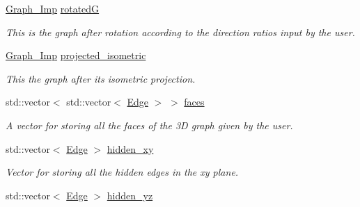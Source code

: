 \begin{DoxyCompactItemize}
\mbox{\label{class_three___d__to___two___d_a89fe876ef08c6dc1a5afd31f64306d8b}} 
\mbox{\hyperlink{class_graph___imp}{Graph\+\_\+\+Imp}} \mbox{\hyperlink{class_three___d__to___two___d_a89fe876ef08c6dc1a5afd31f64306d8b}{rotatedG}}
\begin{DoxyCompactList}\small\item\em This is the graph after rotation according to the direction ratios input by the user. \end{DoxyCompactList}\item 
\mbox{\label{class_three___d__to___two___d_a93664d1beddcbd0153401e363684f2ea}} 
\mbox{\hyperlink{class_graph___imp}{Graph\+\_\+\+Imp}} \mbox{\hyperlink{class_three___d__to___two___d_a93664d1beddcbd0153401e363684f2ea}{projected\+\_\+isometric}}
\begin{DoxyCompactList}\small\item\em This the graph after its isometric projection. \end{DoxyCompactList}\item 
\mbox{\label{class_three___d__to___two___d_a1cd5ced0bcecb01a9152a4c67ec0146a}} 
std\+::vector$<$ std\+::vector$<$ \mbox{\hyperlink{struct_edge}{Edge}} $>$ $>$ \mbox{\hyperlink{class_three___d__to___two___d_a1cd5ced0bcecb01a9152a4c67ec0146a}{faces}}
\begin{DoxyCompactList}\small\item\em A vector for storing all the faces of the 3D graph given by the user. \end{DoxyCompactList}\item 
\mbox{\label{class_three___d__to___two___d_a57484a2739cb7c3b1ae1cc08f6de4469}} 
std\+::vector$<$ \mbox{\hyperlink{struct_edge}{Edge}} $>$ \mbox{\hyperlink{class_three___d__to___two___d_a57484a2739cb7c3b1ae1cc08f6de4469}{hidden\+\_\+xy}}
\begin{DoxyCompactList}\small\item\em Vector for storing all the hidden edges in the xy plane. \end{DoxyCompactList}\item 
\mbox{\label{class_three___d__to___two___d_a4da1d5c5ee69d88ecdd3e77cb43ffa4e}} 
std\+::vector$<$ \mbox{\hyperlink{struct_edge}{Edge}} $>$ \mbox{\hyperlink{class_three___d__to___two___d_a4da1d5c5ee69d88ecdd3e77cb43ffa4e}{hidden\+\_\+yz}}

\end{DoxyCompactItemize}
